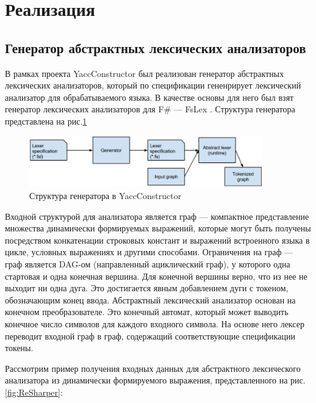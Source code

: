\documentclass{matmex-diploma}
\begin{document}
\section{Реализация}
\begin{enumerate}
\subsection {Генератор абстрактных лексических анализаторов}

В рамках проекта YaccConstructor был реализован генератор абстрактных лексических анализаторов, который по спецификации гененрирует лексический 
анализатор для обрабатываемого языка. В качестве основы для него был взят генератор лексических анализаторов для F\# --- FsLex \cite{FsLex}. 
Структура генератора представлена на рис.\ref{fig:Generator}

\begin{figure}[h!]
\begin{center}
\includegraphics[width=0.9\textwidth]{Generator}
\caption{Структура генератора в YaccConstructor}
\label{fig:Generator} 
\end{center}
\end{figure}

Входной структурой для анализатора является граф --- компактное представление множества динамически формируемых выражений, которые могут быть получены 
посредством конкатенации строковых констант и выражений встроенного языка в цикле, условных выражениях и другими способами. Ограничения на граф --- граф 
является DAG-ом (направленный ациклический граф), у которого одна стартовая и одна конечная вершина. Для конечной вершины верно, что из нее не выходит ни 
одна дуга. Это достигается явным добавлением дуги с токеном, обозначающим конец ввода. Абстрактный лексический анализатор основан на конечном преобразователе. 
Это конечный автомат, который может выводить конечное число символов для каждого входного символа. На основе него лексер переводит входной граф в граф, 
содержащий соответствующие спецификации токены. 

Рассмотрим пример получения входных данных для абстрактного лексического анализатора  из динамически формируемого выражения, представленного 
на рис.\ref{fig:ReSharper}:
	

\end{enumerate}
\end{document}
